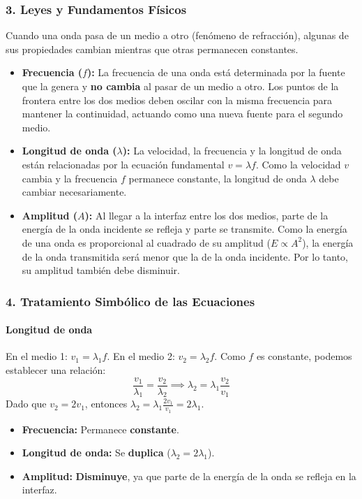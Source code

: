 \subsubsection*{3. Leyes y Fundamentos Físicos}
Cuando una onda pasa de un medio a otro (fenómeno de refracción), algunas de sus propiedades cambian mientras que otras permanecen constantes.
\begin{itemize}
    \item \textbf{Frecuencia ($f$):} La frecuencia de una onda está determinada por la fuente que la genera y \textbf{no cambia} al pasar de un medio a otro. Los puntos de la frontera entre los dos medios deben oscilar con la misma frecuencia para mantener la continuidad, actuando como una nueva fuente para el segundo medio.
    
    \item \textbf{Longitud de onda ($\lambda$):} La velocidad, la frecuencia y la longitud de onda están relacionadas por la ecuación fundamental $v = \lambda f$. Como la velocidad $v$ cambia y la frecuencia $f$ permanece constante, la longitud de onda $\lambda$ debe cambiar necesariamente.
    
    \item \textbf{Amplitud ($A$):} Al llegar a la interfaz entre los dos medios, parte de la energía de la onda incidente se refleja y parte se transmite. Como la energía de una onda es proporcional al cuadrado de su amplitud ($E \propto A^2$), la energía de la onda transmitida será menor que la de la onda incidente. Por lo tanto, su amplitud también debe disminuir.
\end{itemize}

\subsubsection*{4. Tratamiento Simbólico de las Ecuaciones}
\paragraph{Longitud de onda}
En el medio 1: $v_1 = \lambda_1 f$.
En el medio 2: $v_2 = \lambda_2 f$.
Como $f$ es constante, podemos establecer una relación:
$$ \frac{v_1}{\lambda_1} = \frac{v_2}{\lambda_2} \implies \lambda_2 = \lambda_1 \frac{v_2}{v_1} $$
Dado que $v_2 = 2v_1$, entonces $\lambda_2 = \lambda_1 \frac{2v_1}{v_1} = 2\lambda_1$.

\begin{cajaresultado}
\begin{itemize}
    \item \textbf{Frecuencia:} Permanece \textbf{constante}.
    \item \textbf{Longitud de onda:} Se \textbf{duplica} ($\lambda_2 = 2\lambda_1$).
    \item \textbf{Amplitud:} \textbf{Disminuye}, ya que parte de la energía de la onda se refleja en la interfaz.
\end{itemize}
\end{cajaresultado}

